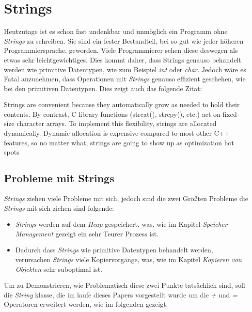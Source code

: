 \section{Strings}
Heutzutage ist es schon fast undenkbar und unmöglich ein Programm ohne \emph{Strings} zu
schreiben. Sie sind ein fester Bestandteil, bei so gut wie jeder höheren Programmiersprache,
geworden. Viele Programmierer sehen diese deswegen als etwas sehr leichtgewichtiges. Dies kommt
daher, dass Strings genauso behandelt werden wie primitive Datentypen, wie zum Beispiel \emph{int}
oder \emph{char}. Jedoch wäre es Fatal anzunehmen, dass Operationen mit \emph{Strings} genauso
effizient
geschehen, wie bei den primitiven Datentypen. Dies zeigt auch das folgende Zitat:

\begin{zitat}
    Strings are convenient because they automatically grow as needed to hold their contents. By
    contrast, C library functions (strcat(), strcpy(), etc.) act on fixed-size character arrays.
    To implement this flexibility, strings are allocated dynamically. Dynamic allocation is
    expensive compared to most other C++ features, so no matter what, strings are going to show
    up as optimization hot spots \cite{OptimizedC++}
\end{zitat}

\subsection{Probleme mit Strings}
\emph{Strings} ziehen viele Probleme mit sich, jedoch sind die zwei Größten Probleme die
\emph{Strings} mit sich ziehen sind folgende:

\begin{itemize}
    \item \emph{Strings} werden auf dem \emph{Heap} gespeichert, was, wie im Kapitel
    \emph{Speicher Management} gezeigt ein sehr Teurer Prozess ist.
    \item Dadurch dass \emph{Strings} wie primitive Datentypen behandelt werden, verursachen
    \emph{Strings} viele Kopiervorgänge, was, wie im Kapitel \emph{Kopieren von Objekten} sehr
    suboptimal ist.
\end{itemize}

Um zu Demonstrieren, wie Problematisch diese zwei Punkte tatsächlich sind, soll die \emph{String}
klasse, die im laufe dieses Papers vorgestellt wurde um die \emph{+} und \emph{=} Operatoren
erweitert werden, wie im folgenden gezeigt:

